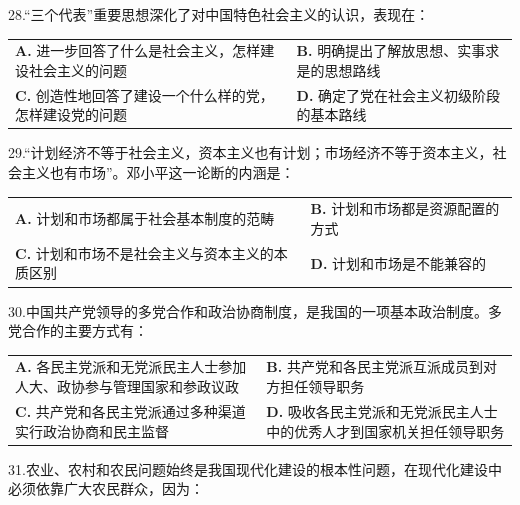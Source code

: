 \documentclass[UTF8,11pt]{ctexart}
\begin{document}
28.“三个代表”重要思想深化了对中国特色社会主义的认识，表现在：


\begin{center}\begin{tabular}{>{\raggedright\arraybackslash}p{\dimexpr(\linewidth-4\tabcolsep)/2\relax}>{\raggedright\arraybackslash}p{\dimexpr(\linewidth-4\tabcolsep)/2\relax}}
\textbf{A.} 进一步回答了什么是社会主义，怎样建设社会主义的问题 & \textbf{B.} 明确提出了解放思想、实事求是的思想路线\\[.35em]
\textbf{C.} 创造性地回答了建设一个什么样的党，怎样建设党的问题 & \textbf{D.} 确定了党在社会主义初级阶段的基本路线\\[.35em]\end{tabular}\end{center}

29.“计划经济不等于社会主义，资本主义也有计划；市场经济不等于资本主义，社会主义也有市场”。邓小平这一论断的内涵是：


\begin{center}\begin{tabular}{>{\raggedright\arraybackslash}p{\dimexpr(\linewidth-4\tabcolsep)/2\relax}>{\raggedright\arraybackslash}p{\dimexpr(\linewidth-4\tabcolsep)/2\relax}}
\textbf{A.} 计划和市场都属于社会基本制度的范畴 & \textbf{B.} 计划和市场都是资源配置的方式\\[.35em]
\textbf{C.} 计划和市场不是社会主义与资本主义的本质区别 & \textbf{D.} 计划和市场是不能兼容的\\[.35em]\end{tabular}\end{center}

30.中国共产党领导的多党合作和政治协商制度，是我国的一项基本政治制度。多党合作的主要方式有：


\begin{center}\begin{tabular}{>{\raggedright\arraybackslash}p{\dimexpr(\linewidth-4\tabcolsep)/2\relax}>{\raggedright\arraybackslash}p{\dimexpr(\linewidth-4\tabcolsep)/2\relax}}
\textbf{A.} 各民主党派和无党派民主人士参加人大、政协参与管理国家和参政议政 & \textbf{B.} 共产党和各民主党派互派成员到对方担任领导职务\\[.35em]
\textbf{C.} 共产党和各民主党派通过多种渠道实行政治协商和民主监督 & \textbf{D.} 吸收各民主党派和无党派民主人士中的优秀人才到国家机关担任领导职务\\[.35em]\end{tabular}\end{center}

31.农业、农村和农民问题始终是我国现代化建设的根本性问题，在现代化建设中必须依靠广大农民群众，因为：
\end{document}
